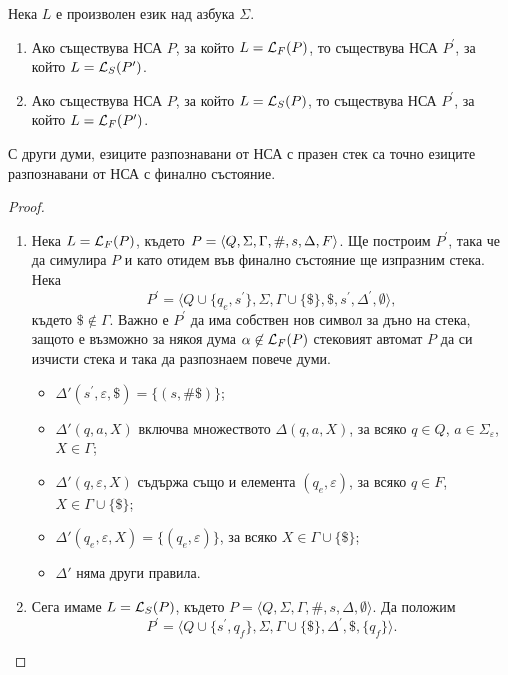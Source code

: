 \begin{thm}
  Нека $L$ е произволен език над азбука $\Sigma$.
  \begin{enumerate}[1)]
  \item 
    Ако съществува НСА $P$, за който $L = \mathcal{L}_F(P)$, то съществува НСА $P^\prime$, за който $L = \mathcal{L}_S(P^\prime)$.
  \item
    Ако съществува НСА $P$, за който $L = \mathcal{L}_S(P)$, то съществува НСА $P^\prime$, за който $L = \mathcal{L}_F(P^\prime)$.
  \end{enumerate}
  С други думи, езиците разпознавани от НСА с празен стек са точно езиците разпознавани от НСА с финално състояние.
\end{thm}
\begin{proof}
  \begin{enumerate}[1)]
  \item 
    Нека $L = \mathcal{L}_F(P)$, където $P = \langle{Q,\Sigma,\Gamma,\#,s,\Delta,F}\rangle$.
    Ще построим $P^\prime$, така че да симулира $P$ и като отидем във финално състояние ще изпразним стека.
    Нека
    \[P^\prime = \langle{Q\cup\{q_e,s^\prime\},\Sigma,\Gamma \cup \{\$\},\$,s^\prime,\Delta^\prime,\emptyset}\rangle,\]
    където $\$ \not\in \Gamma$.
    Важно е $P^\prime$ да има собствен нов символ за дъно на стека, защото е възможно за някоя дума $\alpha \not\in \mathcal{L}_F(P)$
    стековият автомат $P$ да си изчисти стека и така да разпознаем повече думи.
    \begin{itemize}
    \item 
      $\Delta'(s^\prime,\varepsilon,\$) = \{(s,\#\$)\}$;
    \item
      $\Delta'(q,a,X)$ включва множеството $\Delta(q,a,X)$, за всяко $q\in Q$, $a\in\Sigma_\varepsilon$, $X\in\Gamma$;
    \item
      $\Delta'(q,\varepsilon,X)$ съдържа също и елемента $(q_e,\varepsilon)$, за всяко $q\in F$, $X \in \Gamma \cup \{\$\}$;
    \item
      $\Delta'(q_e,\varepsilon,X) = \{(q_e,\varepsilon)\}$, за всяко $X \in \Gamma \cup \{\$\}$;
    \item
      $\Delta'$ няма други правила.
    \end{itemize}
  \item
    Сега имаме $L = \mathcal{L}_S(P)$, където $P = \langle{Q,\Sigma,\Gamma,\#,s,\Delta,\emptyset}\rangle$. 
    Да положим
    \[P^\prime = \langle{Q\cup\{s^\prime,q_f\}, \Sigma, \Gamma \cup \{\$\}, \Delta^\prime, \$, \{q_f\}}\rangle.\]

\end{enumerate}
\end{proof}
